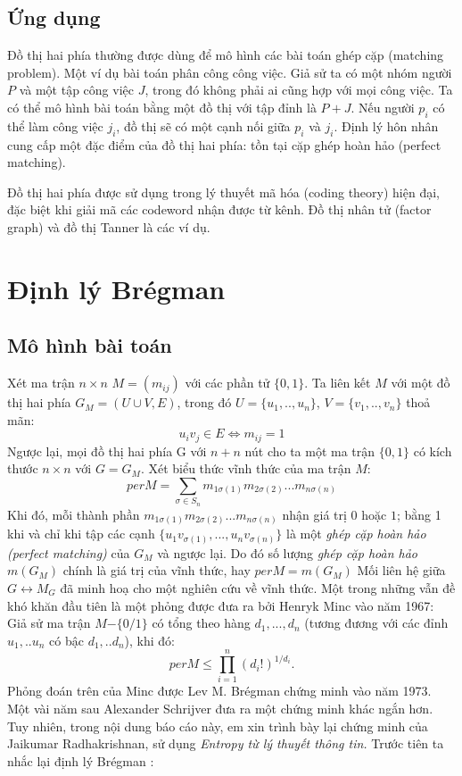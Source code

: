 \documentclass[a4paper, 12pt]{report}
\begin{document}
\subsection{Ứng dụng}
Đồ thị hai phía thường được dùng để mô hình các bài toán ghép cặp (matching problem). Một ví dụ bài toán phân công công việc. Giả sử ta có một nhóm người $P$ và một tập công việc $J$, trong đó không phải ai cũng hợp với mọi công việc. Ta có thể mô hình bài toán bằng một đồ thị với tập đỉnh là $ P + J$. Nếu người $p_i$ có thể làm công việc $j_i$, đồ thị sẽ có một cạnh nối giữa $p_i$ và $j_i$. Định lý hôn nhân cung cấp một đặc điểm của đồ thị hai phía: tồn tại cặp ghép hoàn hảo (perfect matching).

Đồ thị hai phía được sử dụng trong lý thuyết mã hóa (coding theory) hiện đại, đặc biệt khi giải mã các codeword nhận được từ kênh. Đồ thị nhân tử (factor graph) và đồ thị Tanner là các ví dụ.

\section{Định lý Brégman}
\subsection*{Mô hình bài toán}
Xét ma trận $n \times n$ $M =( m_{ij}) $ với các phần tử $\{0,1\}$. Ta liên kết $M$ với một đồ thị hai phía $G_{M} = (U \cup V ,E)$, trong đó $U=\{u_{1},..,u_{n}\}$, $V=\{v_{1},..,v_{n}\}$ thoả mãn: 
\begin{equation*}
    u_{i}v_{j} \in E \Longleftrightarrow m_{ij}=1
\end{equation*}
Ngược lại, mọi đồ thị hai phía G với $n+n$ nút cho ta một ma trận $\{0,1\}$ có kích thước $n \times n$ với $G=G_M$. Xét biểu thức vĩnh thức của ma trận $M$:
\begin{equation*}
	per M = \displaystyle \sum_{\sigma \in S_{n}}m_{1\sigma(1)}m_{2\sigma(2)}...m_{n\sigma(n)}
\end{equation*}
Khi đó, mỗi thành phần $m_{1\sigma(1)}m_{2\sigma(2)}...m_{n\sigma(n)}$ nhận giá trị $0$ hoặc $1$; bằng 1 khi và chỉ khi tập các cạnh $\{u_{1}v_{\sigma(1)},...,u_{n}v_{\sigma(n)}\}$ là một \textit{ghép cặp hoàn hảo (perfect matching)} của $G_M$ và ngược lại. Do đó số lượng \textit{ghép cặp hoàn hảo} $m(G_M)$ chính là giá trị của vĩnh thức, hay $per M = m(G_M)$
Mối liên hệ giữa $G \leftrightarrow M_G$ đã minh hoạ cho một nghiên cứu về vĩnh thức. Một trong những vẫn đề khó khăn đầu tiên là một phỏng được đưa ra bởi Henryk Minc vào năm 1967: Giả sử ma trận $M$$-\{0/1\}$ có tổng theo hàng $d_1,...,d_n$ (tương đương với các đỉnh $u_1,..u_n$ có bậc $d_1,..d_n$), khi đó:
\begin{equation*}
    per M \leq \prod_{i=1}^{n}(d_{i}!)^{1/d_{i}}.
\end{equation*}
Phỏng đoán trên của Minc được Lev M. Brégman chứng minh vào năm 1973. Một vài năm sau Alexander Schrijver đưa ra một chứng minh khác ngắn hơn. Tuy nhiên, trong nội dung báo cáo này, em xin trình bày lại chứng minh của Jaikumar Radhakrishnan, sử dụng \textit{Entropy từ lý thuyết thông tin.} Trước tiên ta nhắc lại định lý Brégman :
\end{document}
